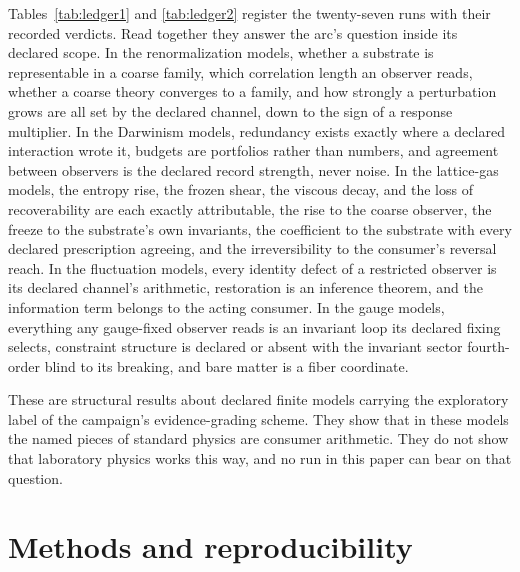 \documentclass[aps,pre,reprint,nofootinbib,floatfix]{revtex4-2}
\begin{document}
Tables~\ref{tab:ledger1} and \ref{tab:ledger2} register the
twenty-seven runs with their recorded verdicts.  Read together they answer the arc's question
inside its declared scope.  In the renormalization models, whether
a substrate is representable in a coarse family, which correlation
length an observer reads, whether a coarse theory converges to a
family, and how strongly a perturbation grows are all set by the
declared channel, down to the sign of a response multiplier.  In the
Darwinism models, redundancy exists exactly where a declared
interaction wrote it, budgets are portfolios rather than numbers,
and agreement between observers is the declared record strength,
never noise.  In the lattice-gas models, the entropy rise, the
frozen shear, the viscous decay, and the loss of recoverability
are each exactly attributable, the rise to the coarse observer,
the freeze to the substrate's own invariants, the coefficient to
the substrate with every declared prescription agreeing, and the
irreversibility to the consumer's reversal reach.  In the
fluctuation models, every identity defect of a restricted observer
is its declared channel's arithmetic, restoration is an inference
theorem, and the information term belongs to the acting consumer.
In the gauge models, everything any gauge-fixed observer reads is
an invariant loop its declared fixing selects, constraint
structure is declared or absent with the invariant sector
fourth-order blind to its breaking, and bare matter is a fiber
coordinate.

These are structural results about declared finite models carrying
the exploratory label of the campaign's evidence-grading scheme.
They show that in these models the named pieces of standard
physics are consumer arithmetic.  They do not show that laboratory
physics works this way, and no run in this paper can bear on that
question.

\section{Methods and reproducibility}
\label{sec:methods}
\end{document}
